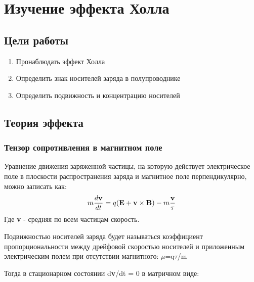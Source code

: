 \documentclass[a4paper, 12pt]{article}
\begin{document}
\newpage

\section{Изучение эффекта Холла}

\subsection{Цели работы}

\begin{enumerate}
	\item Пронаблюдать эффект Холла 
	
	\item Определить знак носителей заряда в полупроводнике 
	
	\item Определить подвижность и концентрацию носителей
	
	
\end{enumerate}
\subsection{Теория эффекта}
\subsubsection{Тензор сопротивления в магнитном поле}
Уравнение движения заряженной частицы, на которую действует электрическое поле в плоскости распространения заряда и магнитное поле перпендикулярно, можно записать как:
\begin{equation}
	m\frac{d\textbf{v}}{dt}=q(\textbf{E}+\textbf{v}\times\textbf{B})-m\frac{\textbf{v}}{\tau} \\
\end{equation}
Где \textbf{v} - средняя по всем частицам скорость. 

Подвижностью носителей заряда будет называться коэффициент пропорциональности между дрейфовой скоростью носителей и приложенным электрическим полем при отсутствии магнитного: $\mu$=q$\tau$/m

Тогда в стационарном состоянии d\textbf{v}/dt = 0 в матричном виде:
\end{document}
